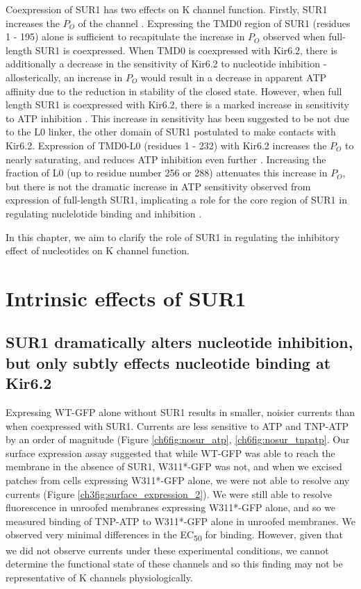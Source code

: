 Coexpression of SUR1 has two effects on K\ATP{} channel function.
Firstly, SUR1 increases the $P_O$ of the channel \cite{tucker_truncation_1997, john_sulphonylurea_1998, chan_n-terminal_2003-1}.
Expressing the TMD0 region of SUR1 (residues 1 - 195) alone is sufficient to recapitulate the increase in $P_O$ observed when full-length SUR1 is coexpressed\cite{babenko_sur_2003-1, chan_n-terminal_2003-1}.
When TMD0 is coexpressed with Kir6.2, there is additionally a decrease in the sensitivity of Kir6.2 to nucleotide inhibition - allosterically, an increase in $P_O$ would result in a decrease in apparent ATP affinity due to the reduction in stability of the closed state.
However, when full length SUR1 is coexpressed with Kir6.2, there is a marked increase in sensitivity to ATP inhibition \cite{tucker_truncation_1997, john_sulphonylurea_1998, chan_n-terminal_2003-1, ribalet_atp-sensitive_2006}.
This increase in sensitivity has been suggested to be not due to the L0 linker, the other domain of SUR1 postulated to make contacts with Kir6.2.
Expression of TMD0-L0 (residues 1 - 232) with Kir6.2 increases the $P_O$ to nearly saturating, and reduces ATP inhibition even further \cite{babenko_sur_2003-1}.
Increasing the fraction of L0 (up to residue number 256 or 288) attenuates this increase in $P_O$, but there is not the dramatic increase in ATP sensitivity observed from expression of full-length SUR1, implicating a role for the core region of SUR1 in regulating nuclelotide binding and inhibition \cite{puljung_cryo-electron_2018}.

In this chapter, we aim to clarify the role of SUR1 in regulating the inhibitory effect of nucleotides on K\ATP{} channel function.

\section{Intrinsic effects of SUR1}

\subsection{SUR1 dramatically alters nucleotide inhibition, but only subtly effects nucleotide binding at Kir6.2}
Expressing WT-GFP alone without SUR1 results in smaller, noisier currents than when coexpressed with SUR1.
Currents are less sensitive to ATP and TNP-ATP by an order of magnitude (Figure \ref{ch6fig:nosur_atp}, \ref{ch6fig:nosur_tnpatp}.
Our surface expression assay suggested that while WT-GFP was able to reach the membrane in the absence of SUR1, W311*-GFP was not, and when we excised patches from cells expressing W311*-GFP alone, we were not able to resolve any currents (Figure \ref{ch3fig:surface_expression_2}).
We were still able to resolve fluorescence in unroofed membranes expressing W311*-GFP alone, and so we measured binding of TNP-ATP to W311*-GFP alone in unroofed membranes.
We observed very minimal differences in the EC\textsubscript{50} for binding.
However, given that we did not observe currents under these experimental conditions, we cannot determine the functional state of these channels and so this finding may not be representative of K\ATP{} channels physiologically.

